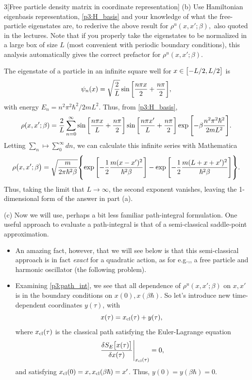 \documentclass[12pt]{article}
\begin{document}
\begin{problem}{3}[Free particle density matrix in coordinate representation]
(b) Use Hamiltonian eigenbasis representation, \cref{p3:H_basis} and your
knowledge of what the free-particle eigenstates are, to rederive the above
result for $\rho^u(x,x';\beta),$ also quoted in the lectures. Note that if you
properly take the eigenstates to be normalized in a large box of size $L$ (most
convenient with periodic boundary conditions), this analysis automatically gives
the correct prefactor for $\rho^u(x,x';\beta)$.
\begin{solution}
The eigenstate of a particle in an infinite square well for
$x\in\qty[-L/2,L/2]$ is
\begin{equation}
    \psi_n(x)=\sqrt{\frac2L}\sin\qty[\frac{n\pi x}{2}+\frac{n\pi}{2}],
\end{equation}
with energy $E_n=n^2\pi^2\hbar^2/2mL^2$. Thus, from \eqref{p3:H_basis},
\begin{align}
    \rho(x,x';\beta)
    =\frac2L\sum_{n=0}^\infty \sin\qty[\frac{n\pi x}{L}+\frac{n\pi}{2}]
    \sin\qty[\frac{n\pi x'}{L}+\frac{n\pi}{2}]
    \exp\qty[-\beta\frac{n^2\pi^2\hbar^2}{2m L^2}].
\end{align}
Letting $\sum_{n}\mapsto\sum_0^\infty dn$, we can calculate this infinite series
with Mathematica
\begin{align}
    \rho\qty(x,x';\beta)
    =\sqrt{\frac{m}{2\pi\hbar^2\beta}}
    \qty{\exp\qty[-\frac12\frac{m(x-x')^2}{\hbar^2\beta}]
    -\exp\qty[-\frac12\frac{m(L+x+x')^2}{\hbar^2\beta}]}.
\end{align}
Thus, taking the limit that $L\to\infty$, the second exponent vanishes, leaving
the 1-dimensional form of the answer in part (a).
\end{solution}

(c) Now we will use, perhaps a bit less familiar path-integral formulation. One
useful approach to evaluate a path-integral is that of a semi-classical
saddle-point approximation.

\begin{itemize}
    \item An amazing fact, however, that we will see below is that this
        semi-classical approach is in fact \textit{exact} for a quadratic
        action, as for e.g.,, a free particle and harmonic oscillator (the
        following problem).
    \item Examining \cref{p3:path_int}, we see that all dependence of
        $\rho^u(x,x';\beta)$ on $x,x'$ is in the boundary conditions on
        $x(0),x(\beta\hbar)$. So let's introduce new time-dependent coordinates
        $y(\tau)$, with
        \begin{equation}\label{p3c:new_x}
            x(\tau)=x_{\text{cl}}(\tau)+y(\tau), 
        \end{equation}
        where $x_{\text{cl}}(\tau)$ is the classical path satisfying the
        Euler-Lagrange equation
        \begin{equation}\label{p3c:eom}
            \eval{\frac{\delta S_E\qty[x(\tau)]}{\delta
            x(\tau)}}_{x_\t{cl}(\tau)}=0, 
        \end{equation}
        and satisfying $x_{\text{cl}}(0)=x,x_{\text{cl}}(\beta\hbar)=x'$. Thus,
        $y(0)=y(\beta\hbar)=0$.


\end{itemize}
\end{problem}
\end{document}
